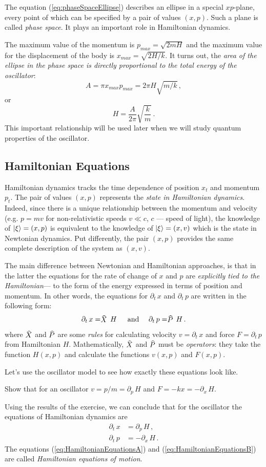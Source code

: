 The equation (\ref{eq:phaseSpaceEllipse}) describes an ellipse in a special $xp$-plane, every point of which can be specified by a pair of values $(x,p)$. Such a plane is called \emph{phase space}. It plays an important role in Hamiltonian dynamics.

The maximum value of the momentum is $p_{max}=\sqrt{2mH}$ and the maximum value for the displacement of the body is $x_{max}=\sqrt{2H/k}$. It turns out, the \emph{area of the ellipse in the phase space is directly proportional to the total energy of the oscillator}:
\[
A=\pi x_{max}p_{max}=2\pi H\sqrt{m/k}\,,
\] 
or
\[
H=\frac{A}{2\pi}\sqrt{\frac{k}{m}}\,.
\]
This important relationship will be used later when we will study quantum properties of the oscillator.

\subsection{Hamiltonian Equations}
Hamiltonian dynamics tracks the time dependence of position $x_t$ and momentum $p_t$. The pair of values $(x,p)$ represents the \emph{state in Hamiltonian dynamics}. Indeed, since there is a unique relationship between the momentum and velocity (e.g. $p=mv$ for non-relativistic speeds $v\ll c$, $c$ — speed of light), the knowledge of $|{\xi}\rangle=(x,p)$ is equivalent to  the knowledge of $|{\xi}\rangle=(x,v)$ which is the state in Newtonian dynamics. Put differently, the pair $(x,p)$ provides the same complete description of the system as $(x, v)$.

The main difference between Newtonian and Hamiltonian approaches, is that in the latter the equations for the rate of change of $x$ and $p$ are \emph{explicitly tied to the Hamiltonian}— to the form of the energy expressed in terms of position and momentum. In other words, the equations for $\partial_t\,x$ and $\partial_t\,p$ are written in the following  form:
\[
\partial_t\, x = \op{X}\,H\,\quad\textrm{ and }\quad \partial_t\, p = \op{P}\,H\,.
\]
where $\op{X}$ and $\op{P}$ are some \emph{rules} for calculating velocity $v=\partial_t\, x$  and force $F=\partial_t\,p$ from Hamiltonian $H$. Mathematically, $\op{X}$ and $\op{P}$ must be \emph{operators}: they take the function $H(x,p)$ and calculate the functions $v(x,p)$ and $F(x,p)$.

Let’s use the oscillator model to see how exactly these equations look like. 

\begin{exercise}
	Show that for an oscillator $v=p/m=\partial_p\, H$ and $F=-kx=-\partial_x\, H$.
\end{exercise}
Using the results of the exercise, we can conclude that for the oscillator the equations of Hamiltonian dynamics are
\begin{align}
	\label{eq:HamiltonianEquationsA}
	\partial_t\,x & =  \partial_p\, H\,,\\
	\partial_t\,p & = -\partial_x\, H\,. 
	\label{eq:HamiltonianEquationsB}
\end{align}
The equations (\ref{eq:HamiltonianEquationsA}) and (\ref{eq:HamiltonianEquationsB}) are called \emph{Hamiltonian equations of motion}.


